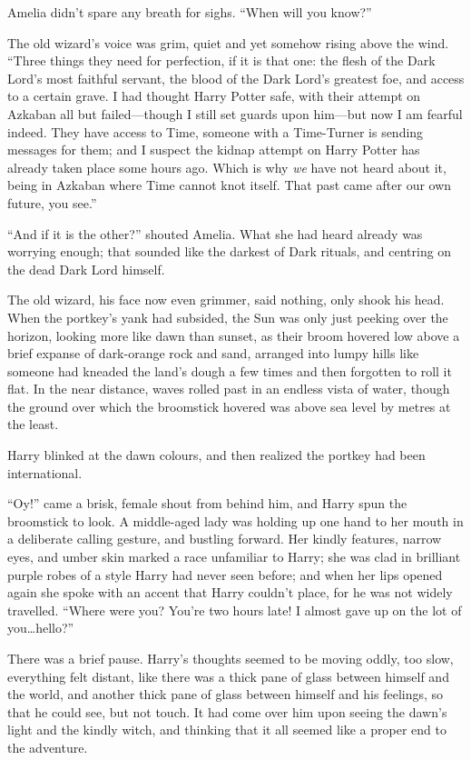 Amelia didn’t spare any breath for sighs. “When will you know?”

The old wizard’s voice was grim, quiet and yet somehow rising above the wind.
“Three things they need for perfection, if it is that one: the flesh of the
Dark Lord’s most faithful servant, the blood of the Dark Lord’s greatest foe,
and access to a certain grave. I had thought Harry Potter safe, with their
attempt on Azkaban all but failed—though I still set guards upon him—but
now I am fearful indeed. They have access to Time, someone with a Time-Turner
is sending messages for them; and I suspect the kidnap attempt on Harry Potter
has already taken place some hours ago. Which is why \emph{we} have not heard
about it, being in Azkaban where Time cannot knot itself. That past came after
our own future, you see.”

“And if it is the other?” shouted Amelia. What she had heard already was
worrying enough; that sounded like the darkest of Dark rituals, and centring
on the dead Dark Lord himself.

The old wizard, his face now even grimmer, said nothing, only shook his head.
\later
When the portkey’s yank had subsided, the Sun was only just peeking over the
horizon, looking more like dawn than sunset, as their broom hovered low above a
brief expanse of dark-orange rock and sand, arranged into lumpy hills like
someone had kneaded the land’s dough a few times and then forgotten to roll it
flat. In the near distance, waves rolled past in an endless vista of water,
though the ground over which the broomstick hovered was above sea level by
metres at the least.

Harry blinked at the dawn colours, and then realized the portkey had been
international.

“Oy!” came a brisk, female shout from behind him, and Harry spun the broomstick
to look. A middle-aged lady was holding up one hand to her mouth in a
deliberate calling gesture, and bustling forward. Her kindly features, narrow
eyes, and umber skin marked a race unfamiliar to Harry; she was clad in
brilliant purple robes of a style Harry had never seen before; and when her
lips opened again she spoke with an accent that Harry couldn’t place, for he
was not widely travelled. “Where were you? You’re two hours late! I almost gave
up on the lot of you…hello?”

There was a brief pause. Harry’s thoughts seemed to be moving oddly, too slow,
everything felt distant, like there was a thick pane of glass between himself
and the world, and another thick pane of glass between himself and his
feelings, so that he could see, but not touch. It had come over him upon seeing
the dawn’s light and the kindly witch, and thinking that it all seemed like a
proper end to the adventure.

